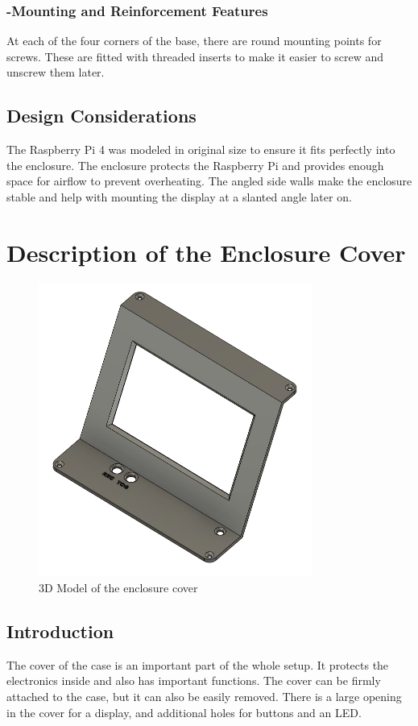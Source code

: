 \subsubsection*{-Mounting and Reinforcement Features}
At each of the four corners of the base, there are round mounting points for screws. These are fitted with threaded inserts to make it easier to screw and unscrew them later.

\subsection*{Design Considerations}
The Raspberry Pi 4 was modeled in original size to ensure it fits perfectly into the enclosure. The enclosure protects the Raspberry Pi and provides enough space for airflow to prevent overheating. The angled side walls make the enclosure stable and help with mounting the display at a slanted angle later on.


\section{Description of the Enclosure Cover}

\begin{figure}[h]
\centering
\includegraphics[width=0.8\textwidth]{assets/DG_Deckel(1)}
\caption{3D Model of the enclosure cover}
\label{fig:cover}
\end{figure}

\subsection*{Introduction}
The cover of the case is an important part of the whole setup. It protects the electronics inside and also has important functions. The cover can be firmly attached to the case, but it can also be easily removed. There is a large opening in the cover for a display, and additional holes for buttons and an LED.

